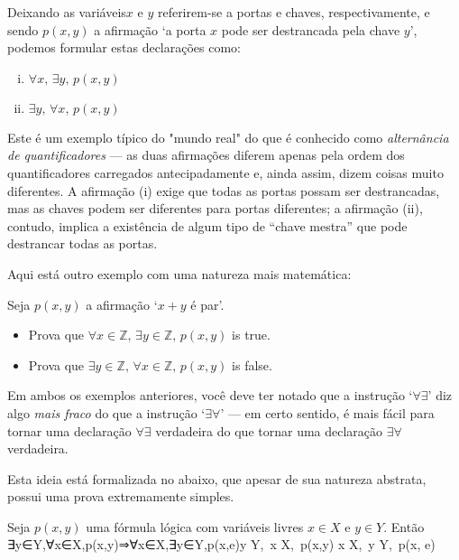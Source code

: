 Deixando as variáveis ​​$x$ e $y$ referirem-se a portas e chaves, respectivamente, e sendo $p(x,y)$ a afirmação `a porta $x$ pode ser destrancada pela chave $y$', podemos formular estas declarações como:
\begin{enumerate}[(i)]
\item $\forall x,\, \exists y,\, p(x,y)$
\item $\exists y,\, \forall x,\, p(x,y)$
\end{enumerate}

Este é um exemplo típico do "mundo real" do que é conhecido como \textit{alternância de quantificadores} --- as duas afirmações diferem apenas pela ordem dos quantificadores carregados antecipadamente e, ainda assim, dizem coisas muito diferentes. A afirmação (i) exige que todas as portas possam ser destrancadas, mas as chaves podem ser diferentes para portas diferentes; a afirmação (ii), contudo, implica a existência de algum tipo de “chave mestra” que pode destrancar todas as portas.

Aqui está outro exemplo com uma natureza mais matemática:

\begin{exercise}
Seja $p(x,y)$ a afirmação `$x + y$ é par'.
\begin{itemize}
\item Prova que $\forall x \in \mathbb{Z},\, \exists y \in \mathbb{Z},\, p(x,y)$ is true.
\item Prova que $\exists y \in \mathbb{Z},\, \forall x \in \mathbb{Z},\, p(x,y)$ is false.
\end{itemize}
\end{exercise}

Em ambos os exemplos anteriores, você deve ter notado que a instrução `$\forall\exists$' diz algo \textit{mais fraco} do que a instrução `$\exists\forall$' --- em certo sentido, é mais fácil para tornar uma declaração $\forall\exists$ verdadeira do que tornar uma declaração $\exists\forall$ verdadeira.

Esta ideia está formalizada no  abaixo, que apesar de sua natureza abstrata, possui uma prova extremamente simples.

\begin{theorem}
\label{thmQuantifierAlternation}
Seja $p(x,y)$ uma fórmula lógica com variáveis ​​livres $x \in X$ e $y \in Y$. Então
∃y∈Y,∀x∈X,p(x,y)⇒∀x∈X,∃y∈Y,p(x,e)\exists y \in Y,\, \forall x \in X,\, p(x,y) \Rightarrow \forall x \in X,\, \exists y \in Y,\, p(x, e)
\end{theorem}

